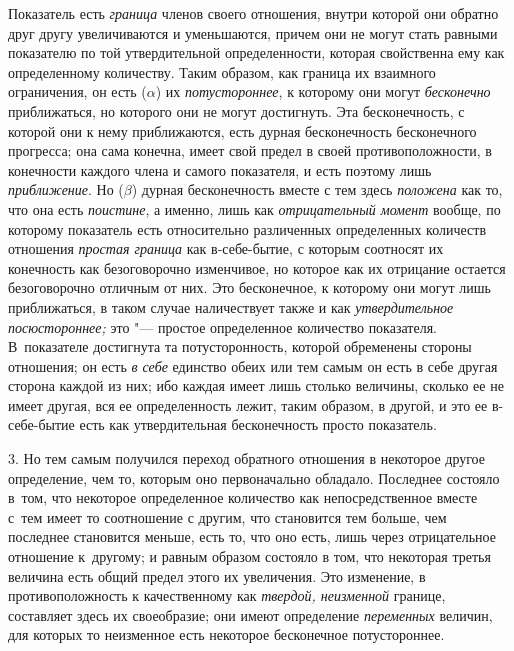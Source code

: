 Показатель есть {\em граница} членов своего отношения, внутри которой они
обратно друг другу увеличиваются и уменьшаются, причем они не могут стать
равными показателю по той утвердительной определенности, которая свойственна
ему как определенному количеству. Таким образом, как граница их взаимного
ограничения, он есть ($\alpha$) их {\em потустороннее}, к которому они могут
{\em бесконечно} приближаться, но которого они не могут достигнуть. Эта
бесконечность, с которой они к нему приближаются, есть дурная бесконечность
бесконечного прогресса; она сама конечна, имеет свой предел в своей
противоположности, в конечности каждого члена и самого показателя, и есть
поэтому лишь {\em приближение}. Но ({\em $\beta$}) дурная бесконечность вместе
с тем здесь {\em положена} как то, что она есть {\em поистине}, а именно, лишь
как {\em отрицательный момент} вообще, по которому показатель есть относительно
различенных определенных количеств отношения {\em простая граница} как
в-себе-бытие, с которым соотносят их конечность как безоговорочно изменчивое,
но которое как их отрицание остается безоговорочно отличным от них. Это
бесконечное, к которому они могут лишь приближаться, в таком случае
наличествует также и как {\em утвердительное посюстороннее;} это "--- простое
определенное количество показателя. В~показателе достигнута та потусторонность,
которой обременены стороны отношения; он есть {\em в себе} единство обеих или
тем самым он есть в себе другая сторона каждой из них; ибо каждая имеет лишь
столько величины, сколько ее не имеет другая, вся ее определенность лежит,
таким образом, в другой, и это ее в-себе-бытие есть как утвердительная
бесконечность просто показатель.

3. Но тем самым получился переход обратного отношения в некоторое другое
определение, чем то, которым оно первоначально обладало. Последнее состояло
в~том, что некоторое определенное количество как непосредственное вместе с~тем
имеет то соотношение с другим, что становится тем больше, чем последнее
становится меньше, есть то, что оно есть, лишь через отрицательное отношение
к~другому; и равным образом состояло в том, что некоторая третья величина есть
общий предел этого их увеличения. Это изменение, в противоположность к
качественному как {\em твердой, неизменной} границе, составляет здесь их
своеобразие; они имеют определение {\em переменных} величин, для которых то
неизменное есть некоторое бесконечное потустороннее.

